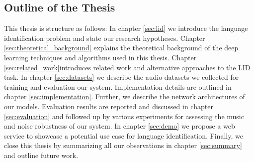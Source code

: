 \subsection{Outline of the Thesis}
This thesis is structure as follows: In chapter \ref{sec:lid} we introduce the language identification problem and state our research hypotheses. Chapter \ref{sec:theoretical_background} explains the theoretical background of the deep learning techniques and algorithms used in this thesis. Chapter \ref{sec:related_work}introduces related work and alternative approaches to the LID task. In chapter \ref{sec:datasets} we describe the audio datasets we collected for training and evaluation our system. Implementation details are outlined in chapter \ref{sec:implementation}. Further, we describe the network architectures of our models. Evaluation results are reported and discussed in chapter \ref{sec:evaluation} and followed up by various experiments for assessing the music and noise robustness of our system. In chapter \ref{sec:demo} we propose a web service to showcase a potential use case for language identification. Finally, we close this thesis by summarizing all our observations in chapter \ref{sec:summary} and outline future work.
